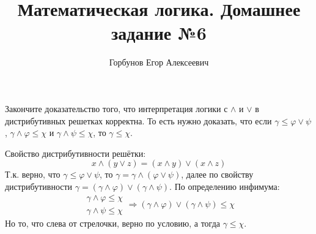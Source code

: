 


\title{Математическая логика. Домашнее задание №6}
\author{Горбунов Егор Алексеевич}


\maketitle

\begin{task}[1]
	Закончите доказательство того, что интерпретация логики с $\land$ и $\lor$ в дистрибутивных решетках корректна.
	То есть нужно доказать, что если $\gamma \leq \varphi \lor \psi$, $\gamma \land \varphi \leq \chi$ и $\gamma \land \psi \leq \chi$, то $\gamma \leq \chi$.
\end{task}
\begin{solution}
Свойство дистрибутивности решётки:
\[
	x \land (y \lor z) = (x \land y) \lor (x \land z)
\]
Т.к. верно, что $\gamma \leq \varphi \lor \psi$, то $\gamma = \gamma \land (\varphi \lor \psi)$, далее по свойству дистрибутивности $\gamma = (\gamma \land \varphi) \lor (\gamma \land \psi)$. По определению инфимума:
\[
	\begin{array}{l}
		\gamma \land \varphi \leq \chi \\
		\gamma \land \psi \leq \chi
	\end{array}
	\Longrightarrow
	(\gamma \land \varphi) \lor (\gamma \land \psi) \leq \chi
\]
Но то, что слева от стрелочки, верно по условию, а тогда $\gamma \leq \chi$. \xqed
\end{solution}


